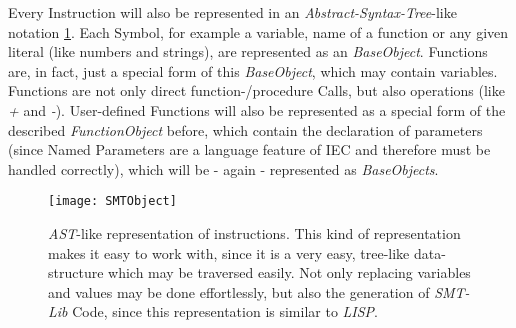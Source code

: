 Every Instruction will also be represented in an \emph{Abstract-Syntax-Tree}-like notation \ref{fig:smtobject}. Each Symbol, for example a variable, name of a function or any given literal (like numbers and strings), are represented as an \emph{BaseObject}. Functions are, in fact, just a special form of this \emph{BaseObject}, which may contain variables. Functions are not only direct function-/procedure Calls, but also operations (like \emph{+} and \emph{-}). User-defined Functions will also be represented as a special form of the described \emph{FunctionObject} before, which contain the declaration of parameters (since Named Parameters are a language feature of IEC and therefore must be handled correctly), which will be - again - represented as \emph{BaseObjects}. 


\begin{figure}[h!]
	\centering
	\texttt{[image: SMTObject]}
	\caption{\emph{AST}-like representation of instructions. This kind of representation makes it easy to work with, since it is a very easy, tree-like data-structure which may be traversed easily. Not only replacing variables and values may be done effortlessly, but also the generation of \emph{SMT-Lib} Code, since this representation is similar to \emph{LISP}.}
	\label{fig:smtobject}
\end{figure}
